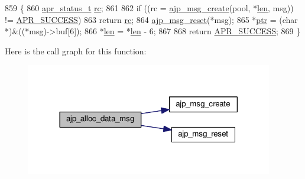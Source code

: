 \begin{DoxyCode}
859 \{
860     \hyperlink{group__apr__errno_gaa5105fa83cc322f09382292db8b47593}{apr\_status\_t} \hyperlink{group__APACHE__CORE__CONFIG_ga2e051c0ce9ee165170cd7973f2464512}{rc};
861 
862     \textcolor{keywordflow}{if} ((rc = \hyperlink{group__AJP__api_ga35845ff07b9af708f3dd4b2285d5ebf8}{ajp\_msg\_create}(pool, *\hyperlink{group__APACHE__CORE__LOG_gab5a43233d60ef05c5b5bf5cba3d74468}{len}, msg)) != \hyperlink{group__apr__errno_ga9ee311b7bf1c691dc521d721339ee2a6}{APR\_SUCCESS})
863         \textcolor{keywordflow}{return} \hyperlink{group__APACHE__CORE__CONFIG_ga2e051c0ce9ee165170cd7973f2464512}{rc};
864     \hyperlink{group__AJP__api_gac85c7fdc0995b29207d13c7ea35b3f1e}{ajp\_msg\_reset}(*msg);
865     *\hyperlink{group__APACHE__CORE__DAEMON_gaad7fdd8e91a6edc850f20f2fede630a9}{ptr} = (\textcolor{keywordtype}{char} *)&((*msg)->buf[6]);
866     *\hyperlink{group__APACHE__CORE__LOG_gab5a43233d60ef05c5b5bf5cba3d74468}{len} =  *\hyperlink{group__APACHE__CORE__LOG_gab5a43233d60ef05c5b5bf5cba3d74468}{len} - 6;
867 
868     \textcolor{keywordflow}{return} \hyperlink{group__apr__errno_ga9ee311b7bf1c691dc521d721339ee2a6}{APR\_SUCCESS};
869 \}
\end{DoxyCode}


Here is the call graph for this function\+:
\nopagebreak
\begin{figure}[H]
\begin{center}
\leavevmode
\includegraphics[width=305pt]{group__AJP__api_ga3af8c5a81f9bc607ee45ca6986678760_cgraph}
\end{center}
\end{figure}


